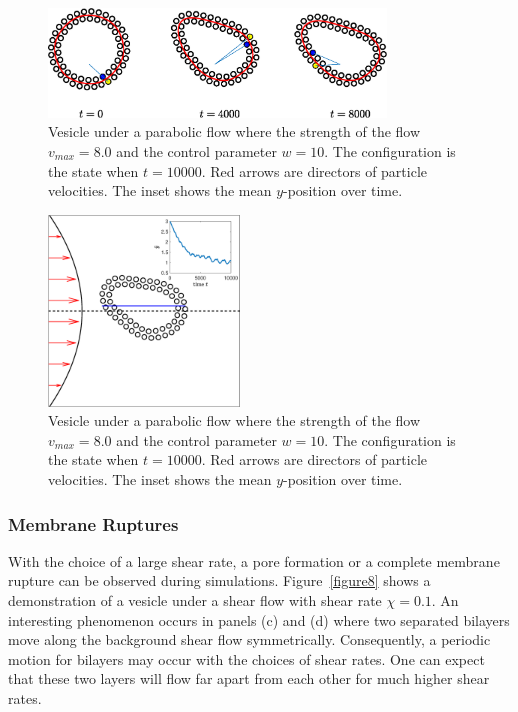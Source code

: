 \documentclass[lineno]{jfm}
\begin{document}
\begin{figure}
\centering
\includegraphics[width=0.8\textwidth]{slipper.eps}
  \caption{Vesicle under a parabolic flow where the strength of the flow $v_{max}=8.0$ and the control parameter $w=10$. The configuration is the state when $t=10000$. Red arrows are directors of particle velocities. The inset shows the mean $y$-position over time. 
  }
    \label{figure6}
\end{figure}


\begin{figure}
\centering
\includegraphics[height=2in]{parabolic.eps}
  \caption{Vesicle under a parabolic flow where the strength of the flow $v_{max}=8.0$ and the control parameter $w=10$. The configuration is the state when $t=10000$. Red arrows are directors of particle velocities. The inset shows the mean $y$-position over time. 
  }
    \label{figure7}
\end{figure}




\subsubsection{Membrane Ruptures}


With the choice of a large shear rate, a pore formation or a complete membrane rupture can be observed during simulations. Figure~\ref{figure8} shows a demonstration of a vesicle under a shear flow with shear rate $\chi=0.1$. An interesting phenomenon occurs in panels (c) and (d) where two separated bilayers move along the background shear flow symmetrically. Consequently, a periodic motion for bilayers may occur 
with the choices of shear rates. One can expect that these two layers will flow far apart from each other for much higher shear rates.
\end{document}
